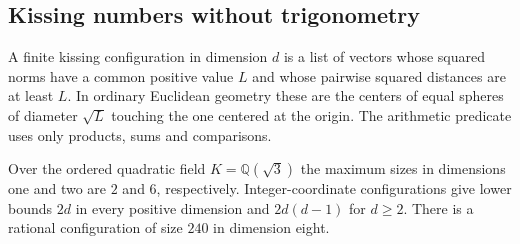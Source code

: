 \subsection{Kissing numbers without trigonometry}

A finite kissing configuration in dimension \(d\) is a list of vectors
whose squared norms have a common positive value \(L\) and whose pairwise
squared distances are at least \(L\). In ordinary Euclidean geometry these
are the centers of equal spheres of diameter \(\sqrt L\) touching the
one centered at the origin. The arithmetic predicate uses only products,
sums and comparisons.

\begin{theorem}\label{result58}
Over the ordered quadratic field \(K=\mathbb Q(\sqrt3)\) the maximum
sizes in dimensions one and two are \(2\) and \(6\), respectively.
Integer-coordinate configurations give lower bounds \(2d\) in every
positive dimension and \(2d(d-1)\) for \(d\ge2\). There is a rational
configuration of size \(240\) in dimension eight.
\end{theorem}
